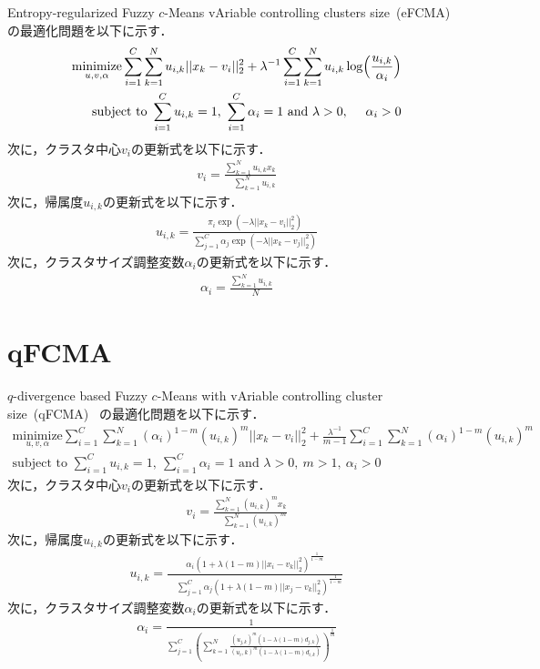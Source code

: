 \documentclass[a4j,12pt,dvipdfmx,oneside]{jsbook}
\theoremstyle{definition}
\begin{document}
 Entropy-regularized Fuzzy $c$-Means vAriable controlling clusters size~(eFCMA)~\cite{eFCMA}
 の最適化問題を以下に示す．
 \begin{align}
  \underset{u,v,\alpha}{\text{minimize}}
  \sum_{i=1}^C\sum_{k=1}^Nu_{i,k}||x_k-v_i||_2^2+\lambda^{-1}\sum_{i=1}^C\sum_{k=1}^Nu_{i,k}\log\Bigl(\frac{u_{i,k}}{\alpha_{i}}\Bigl)\\
  {\text{subject to }}\sum_{i=1}^Cu_{i,k}=1,~\sum_{i=1}^C\alpha_{i}=1{\text{ and }}\lambda>0,~\quad\alpha_{i}>0
 \end{align}
 次に，クラスタ中心$v_{i}$の更新式を以下に示す．
 \begin{align}
  v_{i}=\frac{\sum_{k=1}^Nu_{i,k}x_{k}}{\quad\sum_{k=1}^Nu_{i,k}}
 \end{align}
 次に，帰属度$u_{i,k}$の更新式を以下に示す．
 \begin{align}
  u_{i,k}=\frac{\pi_{i}\exp(-\lambda||x_k-v_i||_2^2)}{\sum_{j=1}^C\alpha_{j}\exp(-\lambda||x_k-v_j||_2^2)}
 \end{align}
 次に，クラスタサイズ調整変数$\alpha_{i}$の更新式を以下に示す．
 \begin{align}
  \alpha_{i}=\frac{\sum_{k=1}^Nu_{i,k}}{\quad N}
 \end{align}

 \section{qFCMA}\label{sec:qfcma}
 
 $q$-divergence based Fuzzy $c$-Means with vAriable controlling cluster size~(qFCMA)~\cite{qFCMA}
 の最適化問題を以下に示す．
 \begin{align}
  \underset{u,v,\alpha}{\text{minimize}}
  \sum_{i=1}^C\sum_{k=1}^N(\alpha_{i})^{1-m}(u_{i,k})^m||x_k-v_i||_2^2
  +\frac{\lambda^{-1}}{m-1}\sum_{i=1}^C\sum_{k=1}^N(\alpha_{i})^{1-m}(u_{i,k})^m\\
  {\text{subject to }}\sum_{i=1}^Cu_{i,k}=1,~\sum_{i=1}^C\alpha_{i}=1{\text{ and }}\lambda>0,~m>1,~\alpha_{i}>0
 \end{align}
 次に，クラスタ中心$v_{i}$の更新式を以下に示す．
 \begin{align}
  v_{i}=\frac{\sum_{k=1}^N(u_{i,k})^mx_{k}}{\quad\sum_{k=1}^N(u_{i,k})^{m}}
 \end{align}
 次に，帰属度$u_{i,k}$の更新式を以下に示す．
 \begin{align}
  u_{i,k}=\frac{\alpha_{i}(1+\lambda(1-m)||x_i-v_k||_2^2)^\frac{1}{1-m}}{\quad\sum_{j=1}^C\alpha_{j}(1+\lambda(1-m)||x_j-v_k||_2^2)^\frac{1}{1-m}}
 \end{align}
 次に，クラスタサイズ調整変数$\alpha_{i}$の更新式を以下に示す．
 \begin{align}
  \alpha_{i}=\frac{1}{\sum_{j=1}^C\left(\sum_{k=1}^N\frac{(u_{j,k})^m(1-\lambda(1-m)d_{j,k})}{(u_i,k)^m(1-\lambda(1-m)d_{i,k})}\right)^{\frac{1}{m}}}
 \end{align}
\end{document}
